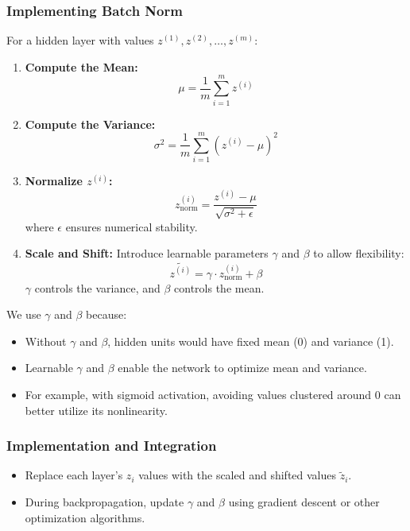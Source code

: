 \documentclass[letterpaper,12pt,notitlepage,twoside]{report}
\begin{document}
\subsubsection{Implementing Batch Norm}
For a hidden layer with values \(z^{(1)}, z^{(2)}, \dots, z^{(m)}\):
\begin{enumerate}[noitemsep, topsep=0pt]
    \item \textbf{Compute the Mean:}
    \[
    \mu = \frac{1}{m} \sum_{i=1}^m z^{(i)}
    \]
    \item \textbf{Compute the Variance:}
    \[
    \sigma^2 = \frac{1}{m} \sum_{i=1}^m (z^{(i)} - \mu)^2
    \]
    \item \textbf{Normalize \(z^{(i)}\):}
    \[
    z^{(i)}_{\text{norm}} = \frac{z^{(i)} - \mu}{\sqrt{\sigma^2 + \epsilon}}
    \]
    where \(\epsilon\) ensures numerical stability.
    \item \textbf{Scale and Shift:}
    Introduce learnable parameters \(\gamma\) and \(\beta\) to allow flexibility:
    \[
    \tilde{z^{(i)}} = \gamma \cdot z^{(i)}_{\text{norm}} + \beta
    \]
    \(\gamma\) controls the variance, and \(\beta\) controls the mean.
\end{enumerate}

We use \(\gamma\) and \(\beta\) because:
\begin{itemize}[noitemsep, topsep=0pt]
    \item Without \(\gamma\) and \(\beta\), hidden units would have fixed mean (0) and variance (1).
    \item Learnable \(\gamma\) and \(\beta\) enable the network to optimize mean and variance.
    \item For example, with sigmoid activation, avoiding values clustered around 0 can better utilize its nonlinearity.
\end{itemize}

\subsubsection{Implementation and Integration}
\begin{itemize}[noitemsep, topsep=0pt]
    \item Replace each layer’s \(z_i\) values with the scaled and shifted values \(\tilde{z}_i\).
    \item During backpropagation, update \(\gamma\) and \(\beta\) using gradient descent or other optimization algorithms.
\end{itemize}
\end{document}
